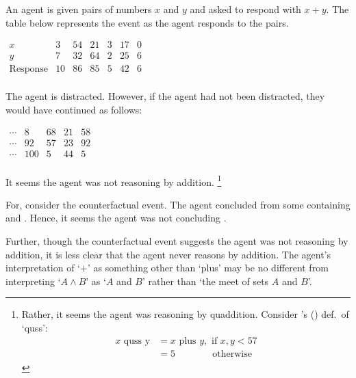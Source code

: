 \begin{note}
  \begin{scenario}[Addition]%
    \label{illu:quus}%
    An agent is given pairs of numbers \(x\) and \(y\) and asked to respond with \(x + y\).
    The table below represents the event as the agent responds to the pairs.

    \medskip
    \hspace{2.8em}%
    \(
      \begin{array}{ccccccc}
      x & 3 & 54 & 21 & 3 & 17 & 0 \\
      y & 7 & 32 & 64 & 2 & 25 & 6 \\
      \hline
      \text{Response} & 10 & 86 & 85 & 5 & 42 & 6 \\
    \end{array}
    \)
    \medskip

    \noindent%
    The agent is distracted.
    However, if the agent had not been distracted, they would have continued as follows:

    \medskip
    \hfill%
    \(
    \begin{array}{ccccc}
      \cdots & 8 & 68 & 21 & 58 \\
      \cdots & 92 & 57 & 23 & 92 \\
      \hline
      \cdots & 100 & 5 & 44 & 5 \\
    \end{array}
    \)%
    \hspace{2.8em}%
    \mbox{ }%
    \newline%
  \end{scenario}

  \noindent%
  It seems the agent was not reasoning by addition.%
  \footnote{
    Rather, it seems the agent was reasoning by quaddition.
    Consider \citeauthor{Kripke:1982aa}'s (\citeyear{Kripke:1982aa}) def.\ of `quss':
    \begin{align*}
      x \text{ quss y} &= x \text{ plus } y, \text{ if } x,y < 57 \\
                       &= 5 \phantom{pl if x,,,} \text{ otherwise }
    \end{align*}
    \vspace{-\baselineskip}
  }

  For, consider the counterfactual event.
  The agent concluded  from some \pool{} containing  and .
  Hence, it seems the agent was not concluding .

  Further, though the counterfactual event suggests the agent was not reasoning by addition, it is less clear that the agent never reasons by addition.
  The agent's interpretation of `\(+\)' as something other than `plus' may be no different from interpreting `\(A \land B\)' as `\(A\) and \(B\)' rather than `the meet of sets \(A\) and \(B\)'.
\end{note}


